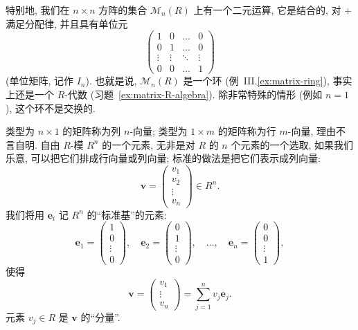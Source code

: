 特别地, 我们在 $n\times n$ 方阵的集合 $\mathcal{M}_n(R)$ 上有一个二元运算, 它是结合的, 对 $+$ 满足分配律, 并且具有单位元
\[
\begin{pmatrix}
1 & 0 & \dots & 0\\
0 & 1 & \dots & 0\\
\vdots & \vdots & \ddots & \vdots\\
0 & 0 & \dots & 1
\end{pmatrix}
\]
(单位矩阵, 记作 $I_n$). 也就是说, $\mathcal{M}_n(R)$ 是一个环 (例~III.\ref{ex:matrix-ring}), 事实上还是一个 $R$-代数 (习题~\ref{ex:matrix-R-algebra}). 除非常特殊的情形 (例如 $n=1$), 这个环不是交换的.

类型为 $n\times 1$ 的矩阵称为列 $n$-向量; 类型为 $1\times m$ 的矩阵称为行 $m$-向量, 理由不言自明. 自由 $R$-模 $R^n$ 的一个元素, 无非是对 $R$ 的 $n$ 个元素的一个选取, 如果我们乐意, 可以把它们排成行向量或列向量; 标准的做法是把它们表示成列向量:
\[
\mathbf{v} = \begin{pmatrix} v_1\\ v_2\\ \vdots\\ v_n\end{pmatrix} \in R^n.
\]
我们将用 $\mathbf{e}_i$ 记 $R^n$ 的``标准基''的元素:
\[
\mathbf{e}_1 = \begin{pmatrix} 1\\ 0\\ \vdots\\ 0\end{pmatrix},\quad
\mathbf{e}_2 = \begin{pmatrix} 0\\ 1\\ \vdots\\ 0\end{pmatrix},\quad \dots,\quad
\mathbf{e}_n = \begin{pmatrix} 0\\ 0\\ \vdots\\ 1\end{pmatrix},
\]
使得
\[
\mathbf{v} = \begin{pmatrix} v_1\\ \vdots\\ v_n\end{pmatrix} = \sum_{j=1}^{n} v_j\mathbf{e}_j.
\]
元素 $v_j\in R$ 是 $\mathbf{v}$ 的``分量''.

